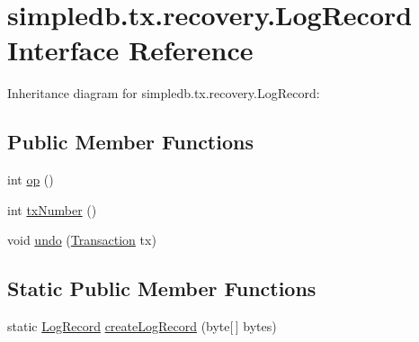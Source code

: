 \hypertarget{interfacesimpledb_1_1tx_1_1recovery_1_1LogRecord}{}\section{simpledb.\+tx.\+recovery.\+Log\+Record Interface Reference}
\label{interfacesimpledb_1_1tx_1_1recovery_1_1LogRecord}


Inheritance diagram for simpledb.\+tx.\+recovery.\+Log\+Record\+:
\subsection*{Public Member Functions}
\begin{DoxyCompactItemize}
\item 
int \hyperlink{interfacesimpledb_1_1tx_1_1recovery_1_1LogRecord_aa97a8907de4709c2b3596e8c9709a26c}{op} ()
\item 
int \hyperlink{interfacesimpledb_1_1tx_1_1recovery_1_1LogRecord_a167f7406c18bf3367f1b83f6853870db}{tx\+Number} ()
\item 
void \hyperlink{interfacesimpledb_1_1tx_1_1recovery_1_1LogRecord_a1f1949e7f3746b9b8b3bc985c89214e5}{undo} (\hyperlink{classsimpledb_1_1tx_1_1Transaction}{Transaction} tx)
\end{DoxyCompactItemize}
\subsection*{Static Public Member Functions}
\begin{DoxyCompactItemize}
\item 
static \hyperlink{interfacesimpledb_1_1tx_1_1recovery_1_1LogRecord}{Log\+Record} \hyperlink{interfacesimpledb_1_1tx_1_1recovery_1_1LogRecord_a2c292397e0409fe26f4208aec31776bf}{create\+Log\+Record} (byte\mbox{[}$\,$\mbox{]} bytes)
\end{DoxyCompactItemize}
